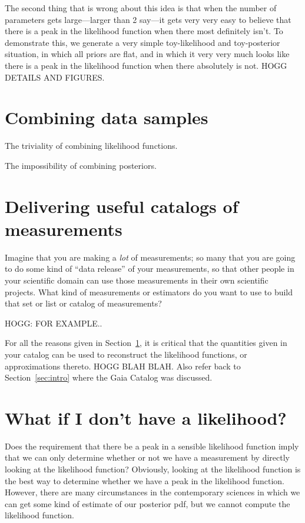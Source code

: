 \documentclass{article}
\newcommand{\sectionname}{Section}
\newcommand{\secref}[1]{\sectionname~\ref{#1}}
\begin{document}
The second thing that is wrong about this idea is that when the number of parameters gets large---larger than 2 say---it gets very very easy to believe that there is a peak in the likelihood function when there most definitely isn't.
To demonstrate this, we generate a very simple toy-likelihood and toy-posterior situation, in which all priors are flat, and in which it very very much looks like there is a peak in the likelihood function when there absolutely is not.
HOGG DETAILS AND FIGURES.

\section{Combining data samples}\label{sec:combining}
The triviality of combining likelihood functions.

The impossibility of combining posteriors.

\section{Delivering useful catalogs of measurements}\label{sec:catalogs}
Imagine that you are making a \emph{lot} of measurements; so many that you are going to do some kind of ``data release'' of your measurements, so that other people in your scientific domain can use those measurements in their own scientific projects.
What kind of measurements or estimators do you want to use to build that set or list or catalog of measurements?

HOGG: FOR EXAMPLE..

For all the reasons given in \secref{sec:combining}, it is critical that the quantities given in your catalog can be used to reconstruct the likelihood functions, or approximations thereto.
HOGG BLAH BLAH. Also refer back to \secref{sec:intro} where the Gaia Catalog was discussed.

\section{What if I don't have a likelihood?}\label{sec:lfi}
Does the requirement that there be a peak in a sensible likelihood function imply that we can only determine whether or not we have a measurement by directly looking at the likelihood function?
Obviously, looking at the likelihood function is the best way to determine whether we have a peak in the likelihood function.
However, there are many circumstances in the contemporary sciences in which we can get some kind of estimate of our posterior pdf, but we cannot compute the likelihood function.
\end{document}
